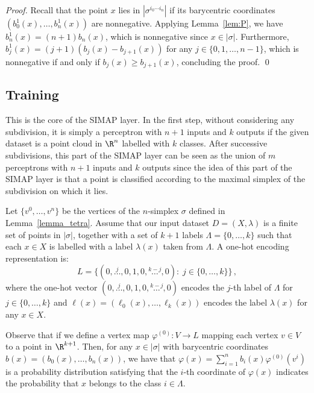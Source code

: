 \begin{proof}
Recall that the point $x$ lies in
$|\sigma^{i_0\cdots i_n}|$ if its barycentric coordinates $(b^1_{0}(x),\dots,b^1_{n}(x))$ are nonnegative. Applying Lemma~\ref{lem:P}, we have $b^1_{n}(x)=(n+1)b_n(x)$, which is nonnegative since $x\in|\sigma|$. Furthermore,
$b^1_{j}(x)=(j+1)(b_{j}(x)-b_{j+1}(x))$ for any $j\in\{0,1,\dots,n-1\}$, which is nonnegative if and only if $b_{j}(x)\geq b_{j+1}(x)$, concluding the proof.
\qed
\end{proof}



\subsection{Training}\label{subsec:training}

This is the core of the SIMAP layer. In the first step, without considering any subdivision,  it is simply a perceptron with $n+1$ inputs and $k$ outputs if the given dataset is a point cloud in $\R^n$ labelled with $k$ classes. After successive subdivisions, this part of the SIMAP layer can be seen as the union of $m$  perceptrons with $n+1$ inputs and $k$ outputs since the idea of this part of the SIMAP layer is that a point is classified according to the maximal simplex of the subdivision on which it lies.
 
Let $\{v^0,\dots,v^n\}$ be the vertices of the $n$-simplex $\sigma$ defined in Lemma~\ref{lemma_tetra}.
Assume that our input dataset $D=(X,\lambda)$ is a finite set of points in $|\sigma|$,  together with a set of $k+1$ labels $\Lambda=\{0,\dots,k\}$ such that  each $x\in X$ 
 is labelled with a label $\lambda(x)$
 taken from $\Lambda$. 
A one-hot encoding representation is:
 $$L=  \big\{(0,\stackrel{j}\dots,0,1,0,\stackrel{k-j}{\dots},0):\;
 j\in \{0,\dots,k\}\big\}\,,
 $$
 where the one-hot vector $(0,\stackrel{j}\dots,0,1,0,\stackrel{k-j}{\dots},0)$ encodes the $j$-th label of $\Lambda$ for $j\in \{0,\dots,k\}$ and $\ell(x)=(\ell_0(x),\dots,\ell_k(x))$ encodes the label $\lambda(x)$ for any $x\in X $.
 
Observe that if we define a vertex map $\varphi^{\scriptscriptstyle (0)}:V\to L$ mapping each vertex $v\in V$ to a point in $\R^{k+1}$. 
Then, for any $x\in |\sigma|$ 
with barycentric coordinates $b(x)=(b_0(x),\dots,b_n(x))$, we have that $\varphi(x)=\sum_{i=1}^nb_i(x)\varphi^{(0)}(v^i)$ is a probability distribution satisfying  that the $i$-th coordinate of $\varphi(x)$ indicates the probability that $x$ belongs to the class $i\in \Lambda$.
 
